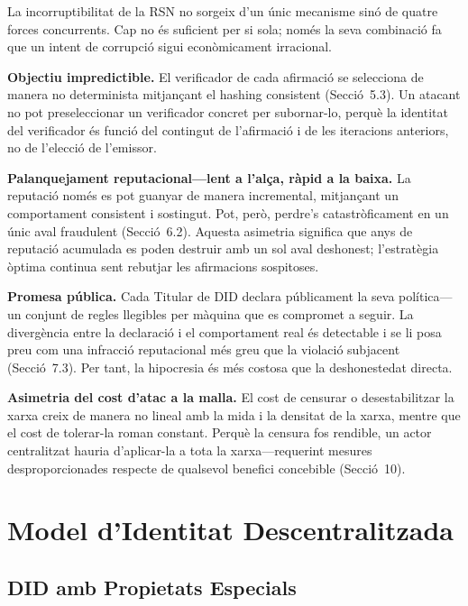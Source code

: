 \documentclass[11pt,a4paper,twocolumn]{article}
\begin{document}
La incorruptibilitat de la RSN no sorgeix d'un únic mecanisme sinó de quatre forces concurrents. Cap no és suficient per si sola; només la seva combinació fa que un intent de corrupció sigui econòmicament irracional.

\textbf{Objectiu impredictible.} El verificador de cada afirmació se selecciona de manera no determinista mitjançant el hashing consistent (Secció~5.3). Un atacant no pot preseleccionar un verificador concret per subornar-lo, perquè la identitat del verificador és funció del contingut de l'afirmació i de les iteracions anteriors, no de l'elecció de l'emissor.

\textbf{Palanquejament reputacional---lent a l'alça, ràpid a la baixa.} La reputació només es pot guanyar de manera incremental, mitjançant un comportament consistent i sostingut. Pot, però, perdre's catastròficament en un únic aval fraudulent (Secció~6.2). Aquesta asimetria significa que anys de reputació acumulada es poden destruir amb un sol aval deshonest; l'estratègia òptima continua sent rebutjar les afirmacions sospitoses.

\textbf{Promesa pública.} Cada Titular de DID declara públicament la seva política---un conjunt de regles llegibles per màquina que es compromet a seguir. La divergència entre la declaració i el comportament real és detectable i se li posa preu com una infracció reputacional més greu que la violació subjacent (Secció~7.3). Per tant, la hipocresia és més costosa que la deshonestedat directa.

\textbf{Asimetria del cost d'atac a la malla.} El cost de censurar o desestabilitzar la xarxa creix de manera no lineal amb la mida i la densitat de la xarxa, mentre que el cost de tolerar-la roman constant. Perquè la censura fos rendible, un actor centralitzat hauria d'aplicar-la a tota la xarxa---requerint mesures desproporcionades respecte de qualsevol benefici concebible (Secció~10).

\section{Model d'Identitat Descentralitzada}

\subsection{DID amb Propietats Especials}
\end{document}
